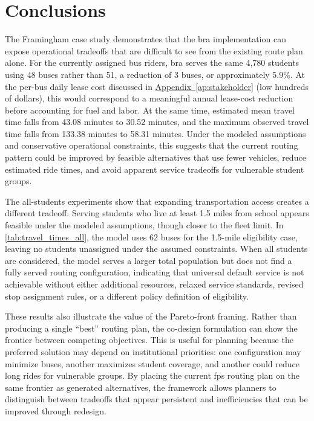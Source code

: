 \chapter{Conclusions}
\label{ch:conclusions}

The Framingham case study demonstrates that the \gls{bra} implementation can expose operational tradeoffs that are difficult to see from the existing route plan alone. For the currently assigned bus riders, \gls{bra} serves the same 4,780 students using 48 buses rather than 51, a reduction of 3 buses, or approximately 5.9\%. At the per-bus daily lease cost discussed in \hyperref[ap:stakeholder]{Appendix~\ref*{ap:stakeholder}} (low hundreds of dollars), this would correspond to a meaningful annual lease-cost reduction before accounting for fuel and labor. At the same time, estimated mean travel time falls from 43.08 minutes to 30.52 minutes, and the maximum observed travel time falls from 133.38 minutes to 58.31 minutes. Under the modeled assumptions and conservative operational constraints, this suggests that the current routing pattern could be improved by feasible alternatives that use fewer vehicles, reduce estimated ride times, and avoid apparent service tradeoffs for vulnerable student groups.

The all-students experiments show that expanding transportation access creates a different tradeoff. Serving students who live at least 1.5 miles from school appears feasible under the modeled assumptions, though closer to the fleet limit. In \autoref{tab:travel_times_all}, the model uses 62 buses for the 1.5-mile eligibility case, leaving no students unassigned under the assumed constraints. When all students are considered, the model serves a larger total population but does not find a fully served routing configuration, indicating that universal default service is not achievable without either additional resources, relaxed service standards, revised stop assignment rules, or a different policy definition of eligibility.

These results also illustrate the value of the Pareto-front framing. Rather than producing a single ``best'' routing plan, the co-design formulation can show the frontier between competing objectives. This is useful for planning because the preferred solution may depend on institutional priorities: one configuration may minimize buses, another maximizes student coverage, and another could reduce long rides for vulnerable groups. By placing the current \gls{fps} routing plan on the same frontier as generated alternatives, the framework allows planners to distinguish between tradeoffs that appear persistent and inefficiencies that can be improved through redesign.

